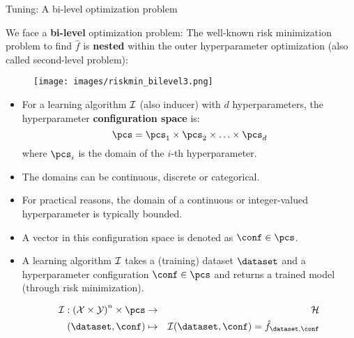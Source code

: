 \begin{frame}{Tuning: A bi-level optimization problem}

\vspace{0.2cm}

We face a \textbf{bi-level} optimization problem: The well-known risk minimization problem to find $\hat f$ is \textbf{nested} within the outer hyperparameter optimization (also called second-level problem):

\begin{center}
\begin{figure}
\texttt{[image: images/riskmin\_bilevel3.png]}
\end{figure}
\end{center}

\framebreak

\begin{itemize}
\item For a learning algorithm $\mathcal{I}$ (also inducer) with $d$ hyperparameters, the hyperparameter \textbf{configuration space} is:
$$\pcs=\pcs_{1} \times \pcs_{2} \times \ldots \times \pcs_{d}$$
where $\pcs_{i}$ is the domain of the $i$-th hyperparameter.
\item The domains can be continuous, discrete or categorical.
\item For practical reasons, the domain of a continuous or integer-valued hyperparameter is typically bounded.
\item A vector in this configuration space is denoted as $\conf \in \pcs$.
\item A learning algorithm $\mathcal{I}$ takes a (training) dataset $\dataset$ and a hyperparameter configuration $\conf \in \pcs$ and returns a trained model (through risk minimization).

\vspace*{-0.2cm}
\begin{eqnarray*}
\inducer: \left(\mathcal{X} \times \mathcal{Y}\right)^n \times \pcs &\to& \mathcal{H} \\
(\dataset, \conf) &\mapsto& \inducer(\dataset, \conf) = \hat f_{\dataset, \conf}
\end{eqnarray*}
\end{itemize}


\end{frame}
